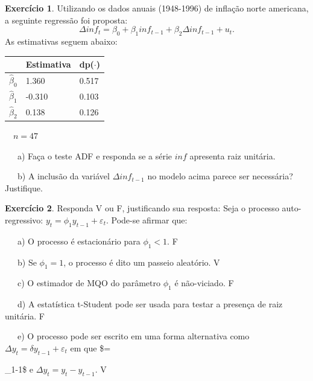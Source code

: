 \documentclass[
]{book}
\theoremstyle{definition}
\theoremstyle{definition}
\theoremstyle{definition}
\newtheorem{exercise}{Exercício}[chapter]
\theoremstyle{remark}
\begin{document}
\begin{exercise}
\protect\hypertarget{exr:exerinf}{}{\label{exr:exerinf} }Utilizando os dados anuais (1948-1996) de inflação norte americana, a seguinte regressão foi proposta:
\[\Delta inf_t =\beta_0 + \beta_1inf_{t-1} + \beta_2 \Delta inf_{t-1} + u_t.\]
As estimativas seguem abaixo:

\begin{longtable}[]{@{}lll@{}}
\toprule
& Estimativa & dp(\(\cdot\))\tabularnewline
\midrule
\endhead
\(\widehat{\beta}_0\) & 1.360 & 0.517\tabularnewline
\(\widehat{\beta}_1\) & -0.310 & 0.103\tabularnewline
\(\widehat{\beta}_2\) & 0.138 & 0.126\tabularnewline
\bottomrule
\end{longtable}

~~\(n=47\)

~~~a) Faça o teste ADF e responda se a série \(inf\) apresenta raiz unitária.

~~~b) A inclusão da variável \(\Delta inf_{t-1}\) no modelo acima parece ser necessária? Justifique.
\end{exercise}

\begin{exercise}
\protect\hypertarget{exr:exervf}{}{\label{exr:exervf} }Responda V ou F, justificando sua resposta: Seja o processo auto-regressivo: \(y_t=\phi_1 y_{t-1} + \varepsilon_t\). Pode-se afirmar que:

~~~a) O processo é estacionário para \(\phi_ 1 < 1\). F

~~~b) Se \(\phi_1 = 1\), o processo é dito um passeio aleatório. V

~~~c) O estimador de MQO do parâmetro \(\phi_1\) é não-viciado. F

~~~d) A estatística t-Student pode ser usada para testar a presença de raiz unitária. F

~~~e) O processo pode ser escrito em uma forma alternativa como \(\Delta y_t = \delta y_{t-1}+\varepsilon_t\) em que \$\delta =

\phi\_1-1\$ e \(\Delta y_t = y_t - y_{t-1}\). V
\end{exercise}
\end{document}
